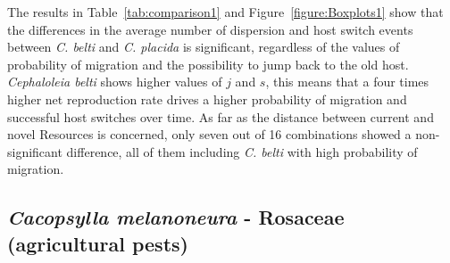 The results in Table~\ref{tab:comparison1} and Figure~\ref{figure:Boxplots1} show that the differences in the average number of dispersion and host switch events between \textit{C. belti} and \textit{C. placida} is significant, regardless of the values of probability of migration and the possibility to jump back to the old host. \textit{Cephaloleia belti} shows higher values of $j$ and $s$, this means that a four times higher net reproduction rate drives a higher probability of migration and successful host switches over time.
As far as the distance between current and novel Resources is concerned, only seven out of 16 combinations showed a non-significant difference, all of them including \textit{C. belti} with high probability of migration.

\subsection{\textit{Cacopsylla melanoneura} - Rosaceae (agricultural pests)}

